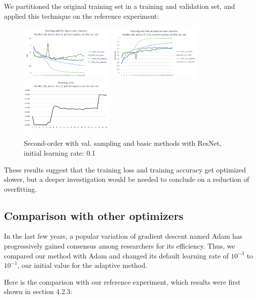 \documentclass{article}
\begin{document}
  We partitioned the original training set in a training and validation set, and applied this technique on the reference experiment:\\
  
  \begin{figure}[!h]
	\includegraphics[width=130pt]{loss_resnet_val_0_1.png}
	\includegraphics[width=130pt]{acc_resnet_val_0_1.png}
	\includegraphics[width=130pt]{lr_resnet_val_0_1.png}
	\caption{Second-order with val. sampling and basic methods with ResNet, initial learning rate: 0.1}
  \end{figure}

   These results suggest that the training loss and training accuracy get optimized slower, but a deeper investigation would be needed to conclude on a reduction of overfitting.   
  
  \subsection{Comparison with other optimizers}
  
  In the last few years, a popular variation of gradient descent named Adam \cite{kingma2014adam} has progressively gained consensus among researchers for its efficiency. Thus, we compared our method with Adam and changed its default learning rate of $10^{-3}$ to $10^{-1}$, our initial value for the adaptive method.
  
  Here is the comparison with our reference experiment, which results were first shown in section 4.2.3:\\ 
  
\end{document}
